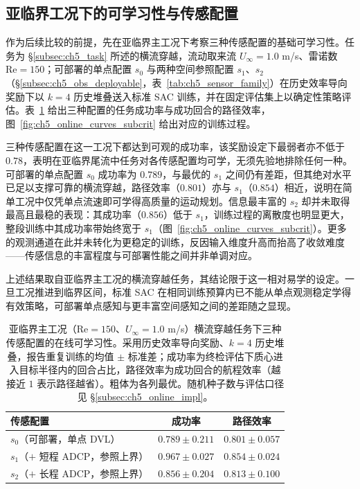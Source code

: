 \subsection{亚临界工况下的可学习性与传感配置}\label{subsec:ch5_online_feasibility}

作为后续比较的前提，先在亚临界主工况下考察三种传感配置的基础可学习性。任务为 \S\ref{subsec:ch5_task} 所述的横流穿越，流动取来流 $U_\infty=1.0$ m/s、雷诺数 $\mathrm{Re}=150$；可部署的单点配置 $s_0$ 与两种空间参照配置 $s_1$、$s_2$（\S\ref{subsec:ch5_obs_deployable}，表~\ref{tab:ch5_sensor_family}）在历史效率导向奖励下以 $k=4$ 历史堆叠送入标准 SAC 训练，并在固定评估集上以确定性策略评估。表~\ref{tab:ch5_a0_sensor} 给出三种配置的任务成功率与成功回合的路径效率，图~\ref{fig:ch5_online_curves_subcrit} 给出对应的训练过程。

三种传感配置在这一工况下都达到可观的成功率，该奖励设定下最弱者亦不低于 $0.78$，表明在亚临界尾流中任务对各传感配置均可学，无须先验地排除任何一种。可部署的单点配置 $s_0$ 成功率为 $0.789$，与最优的 $s_1$ 之间仍有差距，但其绝对水平已足以支撑可靠的横流穿越，路径效率（$0.801$）亦与 $s_1$（$0.854$）相近，说明在简单工况中仅凭单点流速即可学得高质量的运动规划。信息最丰富的 $s_2$ 却并未取得最高且最稳的表现：其成功率（$0.856$）低于 $s_1$，训练过程的离散度也明显更大，整段训练中其成功率带始终宽于 $s_1$（图~\ref{fig:ch5_online_curves_subcrit}）。更多的观测通道在此并未转化为更稳定的训练，反因输入维度升高而抬高了收敛难度——传感信息的丰富程度与可部署性能之间并非单调对应。

上述结果取自亚临界主工况的横流穿越任务，其结论限于这一相对易学的设定。一旦工况推进到临界区间，标准 SAC 在相同训练预算内已不能从单点观测稳定学得有效策略，可部署单点感知与更丰富空间感知之间的差距随之显现。

\begin{table}[t]
\centering
\caption{亚临界主工况（$\mathrm{Re}=150$、$U_\infty=1.0$ m/s）横流穿越任务下三种传感配置的在线可学习性。采用历史效率导向奖励、$k=4$ 历史堆叠，报告重复训练的均值 $\pm$ 标准差；成功率为终检评估下质心进入目标半径内的回合占比，路径效率为成功回合的航程效率（越接近 $1$ 表示路径越省）。粗体为各列最优。随机种子数与评估口径见 \S\ref{subsec:ch5_online_impl}。}
\label{tab:ch5_a0_sensor}
\begin{tabular}{lcc}
\toprule
\textbf{传感配置} & \textbf{成功率} & \textbf{路径效率} \\
\midrule
$s_0$（可部署，单点 DVL） & $0.789 \pm 0.211$ & $0.801 \pm 0.057$ \\
$s_1$（$+$ 短程 ADCP，参照上界） & $\mathbf{0.967 \pm 0.027}$ & $\mathbf{0.854 \pm 0.024}$ \\
$s_2$（$+$ 长程 ADCP，参照上界） & $0.856 \pm 0.204$ & $0.813 \pm 0.100$ \\
\bottomrule
\end{tabular}
\end{table}

